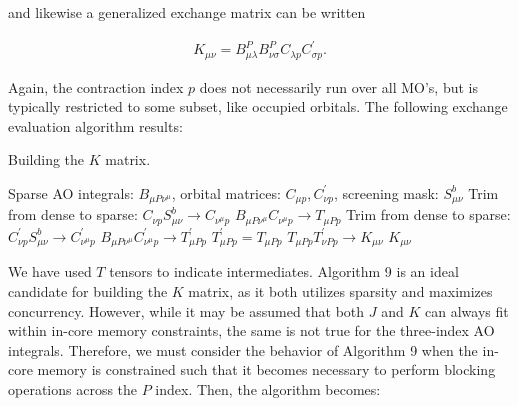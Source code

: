 \noindent and likewise a generalized exchange matrix can be written 

\begin{align}
K_{\mu \nu}= B_{\mu \lambda}^PB_{\nu \sigma}^P C_{\lambda p} C^{\prime}_{\sigma p}.
\end{align}

\noindent Again, the contraction index $p$ does not necessarily run over all MO's, but is typically restricted to some subset, like occupied orbitals.
The following exchange evaluation algorithm results:

\begin{algorithm}[H]
\caption{Building the $K$ matrix.}
\begin{algorithmic}
\REQUIRE Sparse AO integrals: $B_{\mu P \nu^\mu}$, orbital matrices: $C_{\mu p}, C^{\prime}_{\nu p}$, screening mask: $S_{\mu \nu}^b$
    \STATE Trim from dense to sparse: $C_{\nu p}S_{\mu \nu}^b \rightarrow C_{\nu^{\mu} p}$
    \STATE $B_{\mu P \nu^{\mu}} C_{\nu^{\mu} p} \rightarrow T_{\mu Pp}$
        \STATE Trim from dense to sparse: $C^{\prime}_{\nu p}S_{\mu \nu}^b \rightarrow C^{\prime}_{\nu^{\mu} p}$
        \STATE $B_{\mu P \nu^{\mu}} C^{\prime}_{\nu^{\mu} p} \rightarrow T^{\prime}_{\mu Pp}$
    \ELSE
        \STATE $T_{\mu P p}^{\prime} = T_{\mu P p}$ 
    \ENDIF
\ENDFOR
\STATE $T_{\mu P p} T_{\nu P p}^{\prime} \rightarrow K_{\mu \nu} $
\RETURN $K_{\mu \nu}$
\end{algorithmic}
\end{algorithm}

We have used $T$ tensors to indicate intermediates.
Algorithm 9 is an ideal candidate for building the $K$ matrix, as it both utilizes sparsity and maximizes concurrency.
However, while it may be assumed that both $J$ and $K$ can always fit within in-core memory constraints, the same is not true 
for the three-index AO integrals. Therefore, we must consider the behavior of Algorithm 9 when the 
in-core memory is constrained such that it becomes necessary to perform blocking operations across the $P$ index. Then, the algorithm
becomes: 

